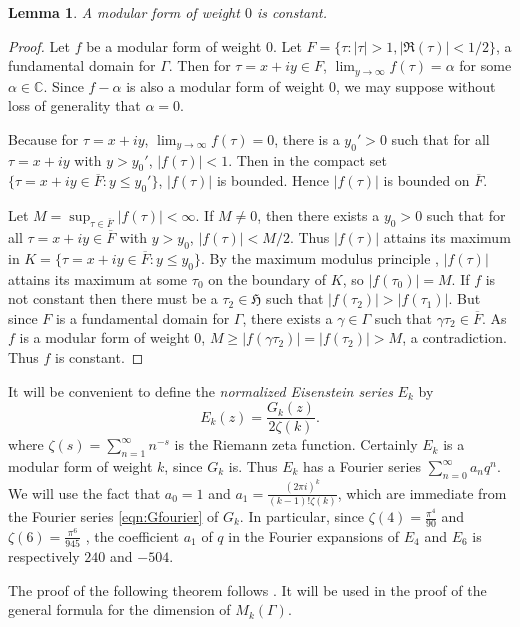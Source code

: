 \documentclass{article}
\newtheorem{lemma}[theorem]{Lemma}
\begin{document}
\begin{lemma}A modular form of weight $0$ is constant.
\end{lemma}
\begin{proof}
Let $f$ be a modular form of weight $0$. Let $F=\{\tau:|\tau|>1, |\Re(\tau)|<1/2\}$, a fundamental
domain for $\Gamma$.
Then for $\tau=x+iy\in F$, $\lim_{y \to \infty} f(\tau)=\alpha$ for some $\alpha \in \mathbb{C}$. Since $f-\alpha$ is also
a modular form of weight $0$, we may suppose without loss of generality that $\alpha=0$. 

Because for $\tau=x+iy$, $\lim_{y \to \infty} f(\tau)=0$, there is a $y_0'>0$ such that
for all $\tau=x+iy$ with $y>y_0'$, $|f(\tau)|<1$. Then in the compact set $\{\tau=x+iy \in \overline{F}: y \leq y_0'\}$,
$|f(\tau)|$ is bounded. Hence $|f(\tau)|$ is bounded on $\overline{F}$.

Let $M=\sup_{\tau \in \overline{F}} |f(\tau)|<\infty$.
If $M \neq 0$, then there exists a $y_0>0$ such that for all
$\tau=x+iy \in \overline{F}$ with $y>y_0$, $|f(\tau)|<M/2$. Thus $|f(\tau)|$ attains its maximum in
$K=\{\tau=x+iy \in \overline{F}: y \leq y_0\}$.
By the maximum modulus principle \cite[Theorem 1.3, Chapter III]{MR1659317}, $|f(\tau)|$ attains its maximum at some $\tau_0$ on the boundary of $K$, so $|f(\tau_0)|=M$.
If $f$
is not constant then there must be a $\tau_2 \in \mathfrak{H}$ such
that $|f(\tau_2)|>|f(\tau_1)|$.
But since $F$ is a fundamental domain for $\Gamma$, there exists a $\gamma \in \Gamma$ such that
$\gamma \tau_2 \in \overline{F}$. As $f$ is a modular form of weight $0$, $M \geq |f(\gamma \tau_2)|=|f(\tau_2)|>M$,
a contradiction. Thus $f$ is constant.
\end{proof}

It will be convenient to define the {\em normalized Eisenstein series} $E_k$ by
\[
E_k(z)=\frac{G_k(z)}{2\zeta(k)}.
\]
where $\zeta(s)=\sum_{n=1}^\infty n^{-s}$ is the Riemann zeta function. Certainly $E_k$ is a modular form of weight $k$,
since $G_k$ is. Thus $E_k$ has a Fourier series $\sum_{n=0}^\infty a_n q^n$. We will use the fact
that $a_0=1$ and $a_1=\frac{(2\pi i)^k}{(k-1)!\zeta(k)}$, which are immediate from the Fourier series \eqref{eqn:Gfourier}
of $G_k$.
In particular, since
$\zeta(4)=\frac{\pi^4}{90}$ and $\zeta(6)=\frac{\pi^6}{945}$ \cite[Proposition 7, Chapter VII]{MR0344216},
the coefficient $a_1$ of $q$ in the Fourier expansions of
$E_4$ and $E_6$
is respectively $240$ and $-504$.

The proof of the following theorem follows \cite[Proposition 1.3.3]{MR1431508}. It will be used in the proof
of the general formula for the dimension of $M_k(\Gamma)$.
\end{document}
